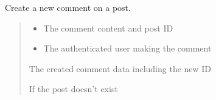 \documentclass[letterpaper,10pt,openany,oneside,english]{sphinxmanual}
\begin{document}
\begin{savenotes}
\begin{fulllineitems}

\begin{savenotes}\begin{fulllineitems}
\label{\detokenize{modules/routers:storeapi.routers.post.PostSorting.OLD}}
\pysigstartsignatures
{}
\pysigstopsignatures
\end{fulllineitems}\end{savenotes}


\end{fulllineitems}\end{savenotes}


\begin{savenotes}\begin{fulllineitems}
\label{\detokenize{modules/routers:storeapi.routers.post.create_comment}}
\pysigstartsignatures
{}
\pysigstopsignatures
\sphinxAtStartPar
Create a new comment on a post.
\begin{quote}\begin{description}
\begin{itemize}
\item {} 
\sphinxAtStartPar
{} \textendash{} The comment content and post ID

\item {} 
\sphinxAtStartPar
{} \textendash{} The authenticated user making the comment

\end{itemize}

\sphinxAtStartPar
The created comment data including the new ID

\sphinxAtStartPar
{} \textendash{} If the post doesn’t exist

\end{description}\end{quote}

\end{fulllineitems}\end{savenotes}
\end{document}
